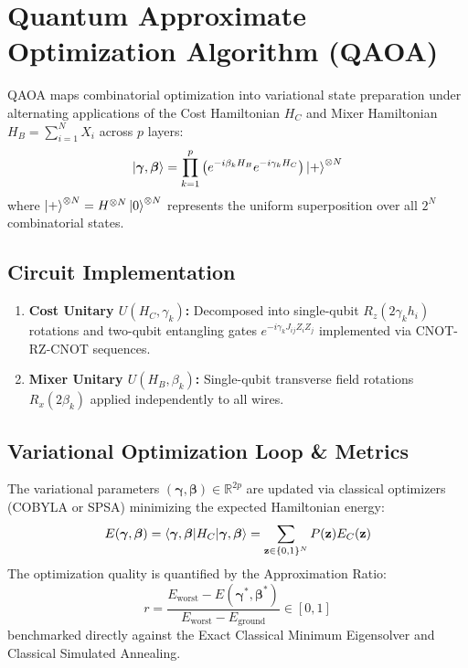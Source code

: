 \section{Quantum Approximate Optimization Algorithm (QAOA)}
\label{sec:qaoa}

QAOA maps combinatorial optimization into variational state preparation under alternating applications of the Cost Hamiltonian $H_C$ and Mixer Hamiltonian $H_B = \sum_{i=1}^N X_i$ across $p$ layers:
\begin{equation}
    \ket{\boldsymbol{\gamma}, \boldsymbol{\beta}} = \prod_{k=1}^p \left( e^{-i \beta_k H_B} e^{-i \gamma_k H_C} \right) \ket{+}^{\otimes N}
\end{equation}
where $\ket{+}^{\otimes N} = H^{\otimes N} \ket{0}^{\otimes N}$ represents the uniform superposition over all $2^N$ combinatorial states.

\subsection{Circuit Implementation}
\begin{enumerate}
    \item \textbf{Cost Unitary $U(H_C, \gamma_k)$:} Decomposed into single-qubit $R_z(2 \gamma_k h_i)$ rotations and two-qubit entangling gates $e^{-i \gamma_k J_{ij} Z_i Z_j}$ implemented via CNOT-RZ-CNOT sequences.
    \item \textbf{Mixer Unitary $U(H_B, \beta_k)$:} Single-qubit transverse field rotations $R_x(2 \beta_k)$ applied independently to all wires.
\end{enumerate}

\subsection{Variational Optimization Loop \& Metrics}
The variational parameters $(\boldsymbol{\gamma}, \boldsymbol{\beta}) \in \mathbb{R}^{2p}$ are updated via classical optimizers (COBYLA or SPSA) minimizing the expected Hamiltonian energy:
\begin{equation}
    E(\boldsymbol{\gamma}, \boldsymbol{\beta}) = \braket{\boldsymbol{\gamma}, \boldsymbol{\beta} | H_C | \boldsymbol{\gamma}, \boldsymbol{\beta}} = \sum_{\mathbf{z} \in \{0, 1\}^N} P(\mathbf{z}) E_C(\mathbf{z})
\end{equation}
The optimization quality is quantified by the Approximation Ratio:
\begin{equation}
    r = \frac{E_{\text{worst}} - E(\boldsymbol{\gamma}^*, \boldsymbol{\beta}^*)}{E_{\text{worst}} - E_{\text{ground}}} \in [0, 1]
\end{equation}
benchmarked directly against the Exact Classical Minimum Eigensolver and Classical Simulated Annealing.
